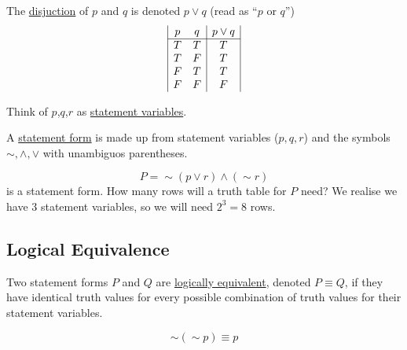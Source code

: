 \begin{definition}The \underline{disjuction} of $p$ and $q$ is denoted $p \lor q$ (read as ``$p$ or $q$'')$$\begin{array}{|c c|c|}
p & q & p\lor q \\
\hline
T & T & T \\
T & F & T \\
F & T & T \\
F & F & F
\end{array}$$\end{definition}



Think of $p$,$q$,$r$ as \underline{statement variables}.

\begin{definition}
    A \underline{statement form} is made up from statement variables ($p,q,r$) and the symbols $\sim , \land, \lor$ with unambiguos parentheses.
\end{definition}

\begin{example}
    $$P = \sim \left(p\lor r\right)\land\left(\sim r\right)$$ is a statement form. How many rows will a truth table for $P$ need? We realise we have 3 statement variables, so we will need $2^3 = 8$ rows.
\end{example}


\subsection{Logical Equivalence}
\begin{definition}
    Two statement forms $P$ and $Q$ are \underline{logically equivalent}, denoted $P\equiv Q$, if they have identical truth values for every possible combination of truth values for their statement variables.
\end{definition}

\begin{example}
    $$\sim\left(\sim p\right) \equiv p$$
\end{example}

